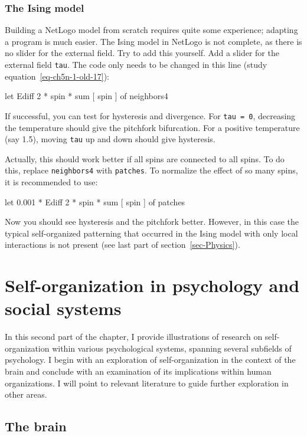 \documentclass[
  a4paper,
  DIV=11,
  numbers=noendperiod,
  oneside]{scrreprt}
\begin{document}
\subsubsection{The Ising model}\label{sec-The-Ising-model}

Building a NetLogo model from scratch requires quite some experience;
adapting a program is much easier. The Ising model in NetLogo is not
complete, as there is no slider for the external field. Try to add this
yourself. Add a slider for the external field \texttt{tau}. The code
only needs to be changed in this line (study
equation~\ref{eq-ch5n-1-old-17}):

{let} {Ediff} {2} {*} {spin} {* sum} {{[} spin {]}} {of neighbors4}

If successful, you can test for hysteresis and divergence. For
\texttt{tau\ =\ 0}, decreasing the temperature should give the pitchfork
bifurcation. For a positive temperature (say 1.5), moving \texttt{tau}
up and down should give hysteresis.

Actually, this should work better if all spins are connected to all
spins. To do this, replace \texttt{neighbors4} with \texttt{patches}. To
normalize the effect of so many spins, it is recommended to use:

{let} {0.001} {*} {Ediff} {2} {*} {spin} {* sum} {{[} spin {]}} {of
patches}

Now you should see hysteresis and the pitchfork better. However, in this
case the typical self-organized patterning that occurred in the Ising
model with only local interactions is not present (see last part of
section~\ref{sec-Physics}).

\section{Self-organization in psychology and social
systems}\label{sec-Selforganization-in-psychology-and-social-systems}

In this second part of the chapter, I provide illustrations of research
on self-organization within various psychological systems, spanning
several subfields of psychology. I begin with an exploration of
self-organization in the context of the brain and conclude with an
examination of its implications within human organizations. I will point
to relevant literature to guide further exploration in other areas.

\subsection{The brain}\label{sec-The-brain}
\end{document}
